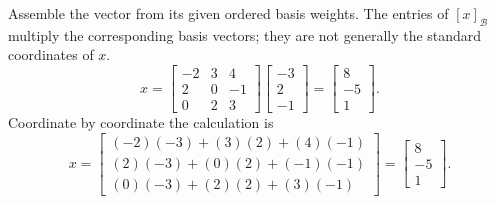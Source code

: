 \goal Assemble the vector from its given ordered basis weights.
The entries of $[x]_{\mathcal B}$ multiply the corresponding basis vectors; they are not generally the standard coordinates of $x$.
\[x=\left[\begin{array}{rrr}-2&3&4\\2&0&-1\\0&2&3\end{array}\right]\left[\begin{array}{r}-3\\2\\-1\end{array}\right]=\left[\begin{array}{r}8\\-5\\1\end{array}\right].\]
Coordinate by coordinate the calculation is
\[x=\begin{bmatrix}(-2)(-3)+(3)(2)+(4)(-1)\\(2)(-3)+(0)(2)+(-1)(-1)\\(0)(-3)+(2)(2)+(3)(-1)\end{bmatrix}=\left[\begin{array}{r}8\\-5\\1\end{array}\right].\]

